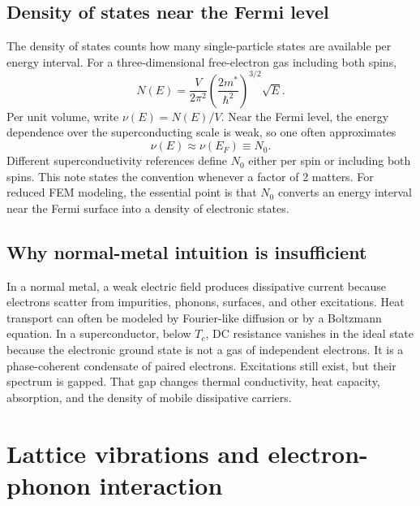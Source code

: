 \documentclass[11pt]{article}
\begin{document}
\subsection{Density of states near the Fermi level}
The density of states counts how many single-particle states are available per energy interval. For a three-dimensional free-electron gas including both spins,
\begin{equation}
N(E)=\frac{V}{2\pi^2}\left(\frac{2m^*}{\hbar^2}\right)^{3/2}\sqrt{E}.
\end{equation}
Per unit volume, write $\nu(E)=N(E)/V$. Near the Fermi level, the energy dependence over the superconducting scale is weak, so one often approximates
\begin{equation}
 \nu(E)\approx \nu(E_F)\equiv N_0.
\end{equation}
Different superconductivity references define $N_0$ either per spin or including both spins. This note states the convention whenever a factor of 2 matters. For reduced FEM modeling, the essential point is that $N_0$ converts an energy interval near the Fermi surface into a density of electronic states.

\subsection{Why normal-metal intuition is insufficient}
In a normal metal, a weak electric field produces dissipative current because electrons scatter from impurities, phonons, surfaces, and other excitations. Heat transport can often be modeled by Fourier-like diffusion or by a Boltzmann equation. In a superconductor, below $T_c$, DC resistance vanishes in the ideal state because the electronic ground state is not a gas of independent electrons. It is a phase-coherent condensate of paired electrons. Excitations still exist, but their spectrum is gapped. That gap changes thermal conductivity, heat capacity, absorption, and the density of mobile dissipative carriers.

\section{Lattice vibrations and electron-phonon interaction}
\end{document}
